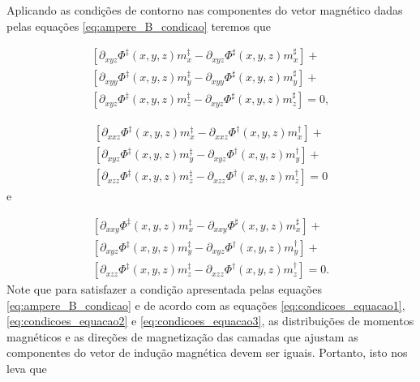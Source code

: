 Aplicando as condições de contorno nas componentes do vetor magnético dadas pelas equações \ref{eq:ampere_B_condicao} teremos que

\begin{equation}
\begin{split}
[\partial_{xyz} \Phi^{\ddagger}(x, y, z) m_{x}^{\ddagger} - \partial_{xyz} \Phi^{\sharp}(x, y, z) m_{x}^{\sharp}] + \\ 
[\partial_{xyy} \Phi^{\ddagger}(x, y, z) m_{y}^{\ddagger} - \partial_{xyy} \Phi^{\sharp}(x, y, z) m_{y}^{\sharp}] + \\ 
[\partial_{xyz} \Phi^{\ddagger}(x, y, z) m_{z}^{\ddagger} - \partial_{xyz} \Phi^{\sharp}(x, y, z) m_{z}^{\sharp}] = 0,
\end{split}
\label{eq:condicoes_equacao1}
\end{equation}

\begin{equation}
\begin{split}
[\partial_{xxz} \Phi^{\ddagger}(x, y, z) m_{x}^{\ddagger} - \partial_{xxz} \Phi^{\dagger}(x, y, z) m_{x}^{\dagger}] + \\ 
[\partial_{xyz} \Phi^{\ddagger}(x, y, z) m_{y}^{\ddagger} - \partial_{xyz} \Phi^{\dagger}(x, y, z) m_{y}^{\dagger}] + \\ 
[\partial_{xzz} \Phi^{\ddagger}(x, y, z) m_{z}^{\ddagger} - \partial_{xzz} \Phi^{\dagger}(x, y, z) m_{z}^{\dagger}]= 0 
\end{split}
\label{eq:condicoes_equacao2}
\end{equation}
e

\begin{equation}
\begin{split}
[\partial_{xxy} \Phi^{\ddagger}(x, y, z) m_{x}^{\ddagger} - \partial_{xxy} \Phi^{\sharp}(x, y, z) m_{x}^{\sharp}] + \\ 
[\partial_{xyz} \Phi^{\ddagger}(x, y, z) m_{y}^{\ddagger} - \partial_{xyz} \Phi^{\dagger}(x, y, z) m_{y}^{\dagger}] + \\
[\partial_{xzz} \Phi^{\ddagger}(x, y, z) m_{z}^{\ddagger} - \partial_{xzz} \Phi^{\dagger}(x, y, z) m_{z}^{\dagger}]  = 0.
\end{split}
\label{eq:condicoes_equacao3}
\end{equation}
Note que para satisfazer a condição apresentada pelas equações \ref{eq:ampere_B_condicao} e de acordo com as equações \ref{eq:condicoes_equacao1}, \ref{eq:condicoes_equacao2} e \ref{eq:condicoes_equacao3}, as distribuições de momentos magnéticos e as direções de magnetização das camadas que ajustam as componentes do vetor de indução magnética devem ser iguais. Portanto, isto nos leva que 

